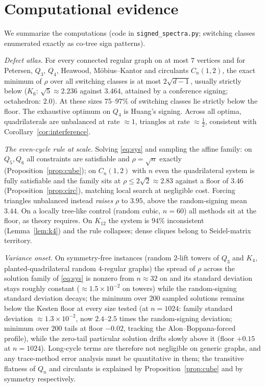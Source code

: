 \documentclass[11pt]{article}
\theoremstyle{remark}
\newcommand{\rhomax}{\rho}
\begin{document}
\section{Computational evidence}\label{sec:experiments}

We summarize the computations (code in \texttt{signed\_spectra.py};
switching classes enumerated exactly as co-tree sign patterns).

\emph{Defect atlas.} For every connected regular graph on at most $7$
vertices and for Petersen, $Q_3$, $Q_4$, Heawood, M\"obius--Kantor and
circulants $C_n(1,2)$, the exact minimum of $\rhomax$ over all switching
classes is at most $2\sqrt{d-1}$, usually strictly below
($K_6$: $\sqrt5\approx2.236$ against $3.464$, attained by a conference
signing; octahedron: $2.0$). At these sizes $75$--$97\%$ of switching
classes lie strictly below the floor. The exhaustive optimum on $Q_4$ is
Huang's signing. Across all optima, quadrilaterals are unbalanced at
rate $\approx1$, triangles at rate $\approx\tfrac12$, consistent with
Corollary~\ref{cor:interference}.

\emph{The even-cycle rule at scale.} Solving \eqref{eq:sys} and sampling
the affine family: on $Q_5,Q_6$ all constraints are satisfiable and
$\rhomax=\sqrt n$ exactly (Proposition~\ref{prop:cube}); on $C_n(1,2)$ with $n$ even the
quadrilateral system is fully satisfiable and the family sits at
$\rhomax\le2\sqrt2\approx2.83$ against a floor of $3.46$
(Proposition~\ref{prop:circ}), matching local search at negligible cost. Forcing triangles
unbalanced instead \emph{raises} $\rhomax$ to $3.95$, above the
random-signing mean $3.44$. On a locally tree-like control (random
cubic, $n=60$) all methods sit at the floor, as theory requires. On
$K_{12}$ the system is $94\%$ inconsistent (Lemma~\ref{lem:k4}) and the
rule collapses; dense cliques belong to Seidel-matrix territory.

\emph{Variance onset.} On symmetry-free instances (random $2$-lift
towers of $Q_3$ and $K_4$, planted-quadrilateral random $4$-regular
graphs) the spread of $\rhomax$ across the solution family of
\eqref{eq:sys} is nonzero from $n\approx32$ on and its standard
deviation stays roughly constant ($\approx1.5\times10^{-2}$ on towers)
while the random-signing standard deviation decays; the minimum over
$200$ sampled solutions remains below the Kesten floor at every size
tested (at $n=1024$: family standard deviation
$\approx1.3\times10^{-2}$, now $2.4$--$2.5$ times the random-signing
deviation; minimum over $200$ tails at floor $-0.02$, tracking the
Alon--Boppana-forced profile), while the zero-tail particular solution
drifts slowly above it (floor $+0.15$ at $n=1024$). Long-cycle terms
are therefore not negligible on generic graphs, and any trace-method
error analysis must be quantitative in them; the transitive flatness of
$Q_n$ and circulants is explained by Proposition~\ref{prop:cube} and by
symmetry respectively.
\end{document}
